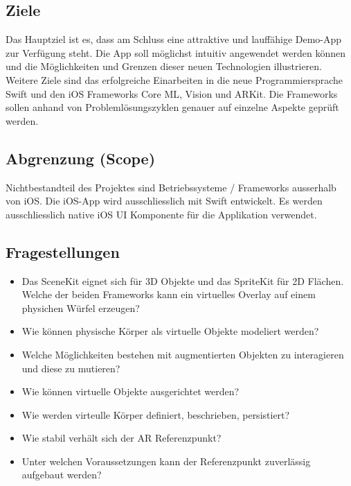 \subsection{Ziele}
Das Hauptziel ist es, dass am Schluss eine attraktive und lauffähige Demo-App zur Verfügung steht. Die App soll möglichst intuitiv angewendet werden können und die Möglichkeiten und Grenzen dieser neuen Technologien illustrieren. Weitere Ziele sind das erfolgreiche Einarbeiten in die neue Programmiersprache Swift und den iOS Frameworks Core ML, Vision und ARKit. Die Frameworks sollen anhand von Problemlösungszyklen genauer auf einzelne Aspekte geprüft werden.

\subsection{Abgrenzung (Scope)}
Nichtbestandteil des Projektes sind Betriebssysteme / Frameworks ausserhalb von iOS. Die iOS-App wird ausschliesslich mit Swift entwickelt. Es werden ausschliesslich native iOS UI Komponente für die Applikation verwendet.

\subsection{Fragestellungen}
\begin{itemize}
	\item Das SceneKit eignet sich für 3D Objekte und das SpriteKit für 2D Flächen. Welche der beiden Frameworks kann ein virtuelles Overlay auf einem physichen Würfel erzeugen?
	\item Wie können physische Körper als virtuelle Objekte modeliert werden?
	\item Welche Möglichkeiten bestehen mit augmentierten Objekten zu interagieren und diese zu mutieren?
	\item Wie können virtuelle Objekte ausgerichtet werden?
	\item Wie werden virteulle Körper definiert, beschrieben, persistiert?
	\item Wie stabil verhält sich der AR Referenzpunkt?
	\item Unter welchen Voraussetzungen kann der Referenzpunkt zuverlässig aufgebaut werden?
\end{itemize}

